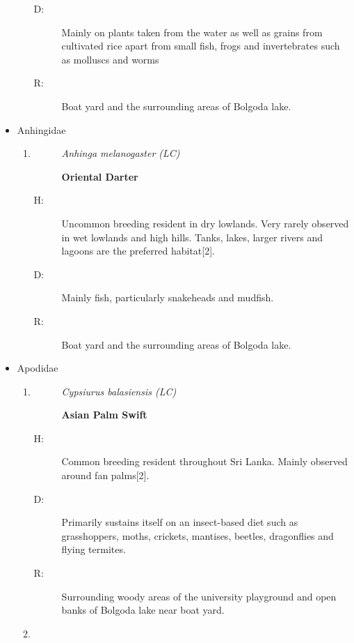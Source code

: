 \begin{itemize}
\begin{enumerate}
\begin{description}
\item[D: ]%
Mainly on plants taken from the water as well as grains from cultivated rice apart from small fish, frogs and invertebrates such as molluscs and worms%
\item[R: ]%
Boat yard and the surrounding areas of Bolgoda lake.%
\end{description}%
\end{enumerate}%
\item%
Anhingidae%
\begin{enumerate}%
\item%
\begin{description}%
\item[]%
\textit{Anhinga melanogaster (LC)}%
\item[]%
\textbf{Oriental Darter}%
\end{description}%
\begin{description}%
\item[H: ]%
Uncommon breeding resident in dry lowlands. Very rarely observed in wet lowlands and high hills. Tanks, lakes, larger rivers and lagoons are the preferred habitat{[}2{]}.%
\item[D: ]%
Mainly fish, particularly snakeheads and mudfish.%
\item[R: ]%
Boat yard and the surrounding areas of Bolgoda lake.%
\end{description}%
\end{enumerate}%
\item%
Apodidae%
\begin{enumerate}%
\item%
\begin{description}%
\item[]%
\textit{Cypsiurus balasiensis (LC)}%
\item[]%
\textbf{Asian Palm Swift}%
\end{description}%
\begin{description}%
\item[H: ]%
Common breeding resident throughout Sri Lanka. Mainly observed around fan palms{[}2{]}.%
\item[D: ]%
Primarily sustains itself on an insect{-}based diet such as grasshoppers, moths, crickets, mantises, beetles, dragonflies and flying termites.%
\item[R: ]%
Surrounding woody areas of the university playground and open banks of Bolgoda lake near boat yard.%
\end{description}%
\item%
\begin{description}%

\end{description}
\end{enumerate}
\end{itemize}
